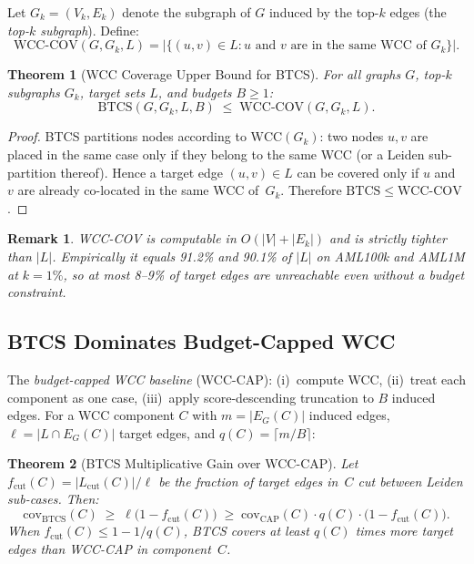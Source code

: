 \documentclass[11pt]{article}
\newtheorem{theorem}{Theorem}
\newtheorem{remark}{Remark}
\begin{document}
Let $G_k=(V_k,E_k)$ denote the subgraph of $G$ induced by the
top-$k$ edges (the \emph{top-$k$ subgraph}).  Define:
\[
  \text{WCC-COV}(G,G_k,L)
  =\bigl|\{(u,v)\in L : u\text{ and }v
         \text{ are in the same WCC of }G_k\}\bigr|.
\]

\begin{theorem}[WCC Coverage Upper Bound for BTCS]\label{thm:wcc-ub}
For all graphs $G$, top-$k$ subgraphs $G_k$, target sets $L$,
and budgets $B\ge 1$:
\[
  \mathrm{BTCS}(G,G_k,L,B)\;\le\;\mathrm{WCC\text{-}COV}(G,G_k,L).
\]
\end{theorem}

\begin{proof}
BTCS partitions nodes according to $\mathrm{WCC}(G_k)$: two nodes
$u,v$ are placed in the same case only if they belong to the same WCC
(or a Leiden sub-partition thereof).  Hence a target edge $(u,v)\in L$
can be covered only if $u$ and~$v$ are already co-located in the same
WCC of~$G_k$.  Therefore $\mathrm{BTCS}\le\mathrm{WCC\text{-}COV}$.
\end{proof}

\begin{remark}
WCC-COV is computable in $O(|V|+|E_k|)$ and is strictly tighter than
$|L|$.  Empirically it equals 91.2\% and 90.1\% of $|L|$ on AML100k
and AML1M at $k=1\%$, so at most 8--9\% of target edges are
unreachable even without a budget constraint.
\end{remark}

\subsection{BTCS Dominates Budget-Capped WCC}

The \emph{budget-capped WCC baseline} (WCC-CAP): (i)~compute WCC,
(ii)~treat each component as one case, (iii)~apply score-descending
truncation to $B$ induced edges.  For a WCC component $C$ with
$m=|E_G(C)|$ induced edges, $\ell=|L\cap E_G(C)|$ target edges, and
$q(C)=\lceil m/B\rceil$:

\begin{theorem}[BTCS Multiplicative Gain over WCC-CAP]\label{thm:gain}
Let $f_{\mathrm{cut}}(C)=|L_{\mathrm{cut}}(C)|/\ell$ be the fraction
of target edges in~$C$ cut between Leiden sub-cases.  Then:
\[
  \mathrm{cov}_{\mathrm{BTCS}}(C)
  \;\ge\;\ell\bigl(1-f_{\mathrm{cut}}(C)\bigr)
  \;\ge\;\mathrm{cov}_{\mathrm{CAP}}(C)\cdot q(C)
         \cdot\bigl(1-f_{\mathrm{cut}}(C)\bigr).
\]
When $f_{\mathrm{cut}}(C)\le 1-1/q(C)$, BTCS covers at least $q(C)$
times more target edges than WCC-CAP in component~$C$.
\end{theorem}
\end{document}
